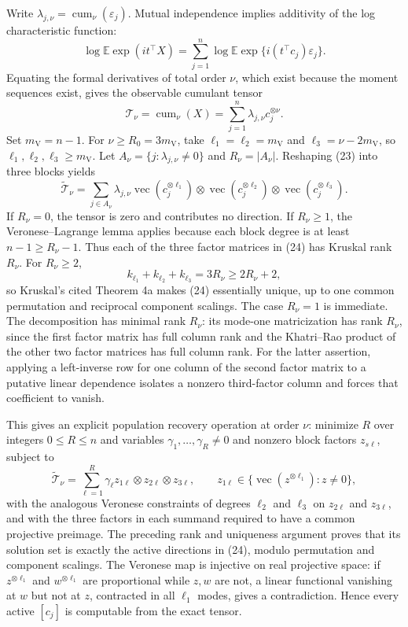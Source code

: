 Write \(\lambda_{j,\nu}=\operatorname{cum}_\nu(\varepsilon_j)\). Mutual independence implies additivity of the log characteristic function:
\[
 \log\mathbb E\exp(i t^{\top}X)
 =\sum_{j=1}^n\log\mathbb E\exp\{i(t^{\top}c_j)\varepsilon_j\}.
\]
Equating the formal derivatives of total order \(\nu\), which exist because the moment sequences exist, gives the observable cumulant tensor
\[
 \mathcal T_\nu=\operatorname{cum}_\nu(X)
 =\sum_{j=1}^n\lambda_{j,\nu}c_j^{\otimes \nu}. \tag{23}
\]
Set \(m_{\mathrm V}=n-1\). For \(\nu\ge R_0=3m_{\mathrm V}\), take \(\ell_1=\ell_2=m_{\mathrm V}\) and \(\ell_3=\nu-2m_{\mathrm V}\), so \(\ell_1,\ell_2,\ell_3\ge m_{\mathrm V}\). Let \(A_\nu=\{j:\lambda_{j,\nu}\ne0\}\) and \(R_\nu=|A_\nu|\). Reshaping (23) into three blocks yields
\[
 \widetilde{\mathcal T}_\nu
 =\sum_{j\in A_\nu}\lambda_{j,\nu}
 \operatorname{vec}(c_j^{\otimes \ell_1})\otimes
 \operatorname{vec}(c_j^{\otimes \ell_2})\otimes
 \operatorname{vec}(c_j^{\otimes \ell_3}). \tag{24}
\]
If \(R_\nu=0\), the tensor is zero and contributes no direction. If \(R_\nu\ge1\), the Veronese--Lagrange lemma applies because each block degree is at least \(n-1\ge R_\nu-1\). Thus each of the three factor matrices in (24) has Kruskal rank \(R_\nu\). For \(R_\nu\ge2\),
\[
 k_{\ell_1}+k_{\ell_2}+k_{\ell_3}=3R_\nu\ge2R_\nu+2,
\]
so Kruskal's cited Theorem 4a makes (24) essentially unique, up to one common permutation and reciprocal component scalings. The case \(R_\nu=1\) is immediate. The decomposition has minimal rank \(R_\nu\): its mode-one matricization has rank \(R_\nu\), since the first factor matrix has full column rank and the Khatri--Rao product of the other two factor matrices has full column rank. For the latter assertion, applying a left-inverse row for one column of the second factor matrix to a putative linear dependence isolates a nonzero third-factor column and forces that coefficient to vanish.

This gives an explicit population recovery operation at order \(\nu\): minimize \(R\) over integers \(0\le R\le n\) and variables \(\gamma_1,\ldots,\gamma_R\ne0\) and nonzero block factors \(z_{s\ell}\), subject to
\[
 \widetilde{\mathcal T}_\nu=\sum_{\ell=1}^R\gamma_\ell z_{1\ell}\otimes z_{2\ell}\otimes z_{3\ell},
 \qquad z_{1\ell}\in\{\operatorname{vec}(z^{\otimes \ell_1}):z\ne0\},
\]
with the analogous Veronese constraints of degrees \(\ell_2\) and \(\ell_3\) on \(z_{2\ell}\) and \(z_{3\ell}\), and with the three factors in each summand required to have a common projective preimage. The preceding rank and uniqueness argument proves that its solution set is exactly the active directions in (24), modulo permutation and component scalings. The Veronese map is injective on real projective space: if \(z^{\otimes \ell_1}\) and \(w^{\otimes \ell_1}\) are proportional while \(z,w\) are not, a linear functional vanishing at \(w\) but not at \(z\), contracted in all \(\ell_1\) modes, gives a contradiction. Hence every active \([c_j]\) is computable from the exact tensor.

